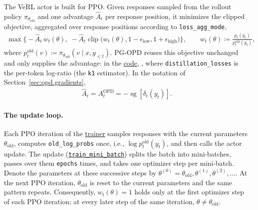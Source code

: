 The VeRL actor is built for PPO. Given responses sampled from the rollout policy
$\pi_{\theta_{\mathrm{old}}}$ and one advantage $\hat A_t$ per response position, it minimizes the
clipped objective, aggregated over response positions according to \texttt{loss\_agg\_mode},
\begin{align}
    \max\!\Big\{
        -\hat A_t\,w_t(\theta),\;
        -\hat A_t\operatorname{clip}\!\big(w_t(\theta),1-\epsilon_{\mathrm{low}},1+\epsilon_{\mathrm{high}}\big)
    \Big\},
    \qquad
    w_t(\theta)
    \coloneqq
    \frac{p_t(y_t)}{p_t^{\mathrm{old}}(y_t)},
    \label{eq:opd.ppo-clip}
\end{align}
where $p_t^{\mathrm{old}}(v)\coloneqq\pi_{\theta_{\mathrm{old}}}(v\mid x,y_{<t})$. PG-OPD reuses this
objective unchanged and only supplies the advantage: in the
\href{https://github.com/verl-project/verl/blob/adc7eefa16dad75c5f7b878823d5a76eac90c7b3/verl/trainer/distillation/losses.py#L280-L288}{code},
, where \texttt{distillation\_losses} is the
per-token log-ratio (the \texttt{k1} estimator). In the notation of
Section~\ref{sec:opd.gradients},
\begin{align*}
    \hat A_t=A_t^{\mathrm{OPD}}=-\operatorname{sg}\!\left[\delta_t(y_t)\right].
\end{align*}

\paragraph{The update loop.}
Each PPO iteration of the \href{https://github.com/verl-project/verl/blob/adc7eefa16dad75c5f7b878823d5a76eac90c7b3/verl/trainer/ppo/ray_trainer.py#L1560}{trainer}
samples responses with the current parameters $\theta_{\mathrm{old}}$, computes
\texttt{old\_log\_probs} once, i.e., $\log p_t^{\mathrm{old}}(y_t)$, and then calls the actor
update. The update
(\href{https://github.com/verl-project/verl/blob/adc7eefa16dad75c5f7b878823d5a76eac90c7b3/verl/workers/engine_workers.py#L242-L310}{\texttt{train\_mini\_batch}})
splits the batch into mini-batches, passes over them \texttt{epochs} times, and takes one
optimizer step per mini-batch. Denote the parameters at these successive steps by
$\theta^{(0)}=\theta_{\mathrm{old}},\theta^{(1)},\theta^{(2)},\ldots$. At the next PPO
iteration, $\theta_{\mathrm{old}}$ is reset to the current parameters and the same pattern
repeats. Consequently, $w_t(\theta)=1$ holds only at the first optimizer step of each PPO
iteration; at every later step of the same iteration, $\theta\neq\theta_{\mathrm{old}}$.

